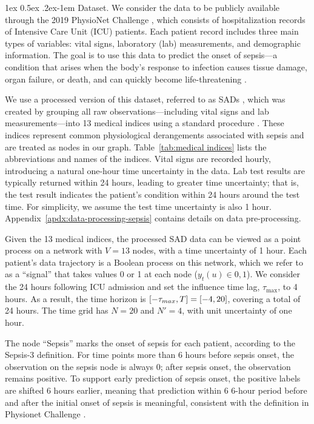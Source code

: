 \documentclass[11pt]{article}
\makeatletter
\theoremstyle{remark}
\theoremstyle{plain}
\renewcommand{\paragraph}{%
  \@startsection{paragraph}{4}%
  {\z@}{1ex \@plus 0.5ex \@minus .2ex}{-1em}%
  {\normalfont\normalsize\itshape}%
}
\makeatother
\begin{document}
\paragraph{Dataset.} We consider the data to be publicly available through the 2019 PhysioNet Challenge \cite{physionetChallenge}, which consists of hospitalization records of Intensive Care Unit (ICU) patients. Each patient record includes three main types of variables: vital signs, laboratory (lab) measurements, and demographic information. The goal is to use this data to predict the onset of sepsis—a condition that arises when the body's response to infection causes tissue damage, organ failure, or death, and can quickly become life-threatening \cite{singer2016third}.

We use a processed version of this dataset, referred to as SADs \cite{wei2021inferringb,wei2023granger,10366499}, which was created by grouping all raw observations—including vital signs and lab measurements—into 13 medical indices using a standard procedure \cite{ABIM_ref_range}. These indices represent common physiological derangements associated with sepsis and are treated as nodes in our graph. Table~\ref{tab:medical indices} lists the abbreviations and names of the indices. Vital signs are recorded hourly, introducing a natural one-hour time uncertainty in the data. Lab test results are typically returned within 24 hours, leading to greater time uncertainty; that is, the test result indicates the patient's condition within 24 hours around the test time. For simplicity, we assume the test time uncertainty is also 1 hour.  Appendix~\ref{apdx:data-processing-sepsis} contains details on data pre-processing.

Given the 13 medical indices, the processed SAD data can be viewed as a point process on a network with $ V=13$ nodes, with a time uncertainty of 1 hour. Each patient’s data trajectory is a Boolean process on this network, which we refer to as a ``signal'' that takes values 0 or 1 at each node ($y_t(u) \in {0, 1}$). We consider the 24 hours following ICU admission and set the influence time lag, $\tau_{\max}$, to 4 hours. As a result, the time horizon is $[-\tau_{\rm max}, T] = [-4, 20]$, covering a total of 24 hours. The time grid has $N = 20$ and $N' = 4$, with unit uncertainty of one hour. 

The node ``Sepsis'' marks the onset of sepsis for each patient, according to the Sepsis-3 definition. For time points more than 6 hours before sepsis onset, the observation on the sepsis node is always 0; after sepsis onset, the observation remains positive. To support early prediction of sepsis onset, the positive labels are shifted 6 hours earlier, meaning that prediction within 6 6-hour period before and after the initial onset of sepsis is meaningful, consistent with the definition in Physionet Challenge \cite{physionetChallenge}.
\end{document}
